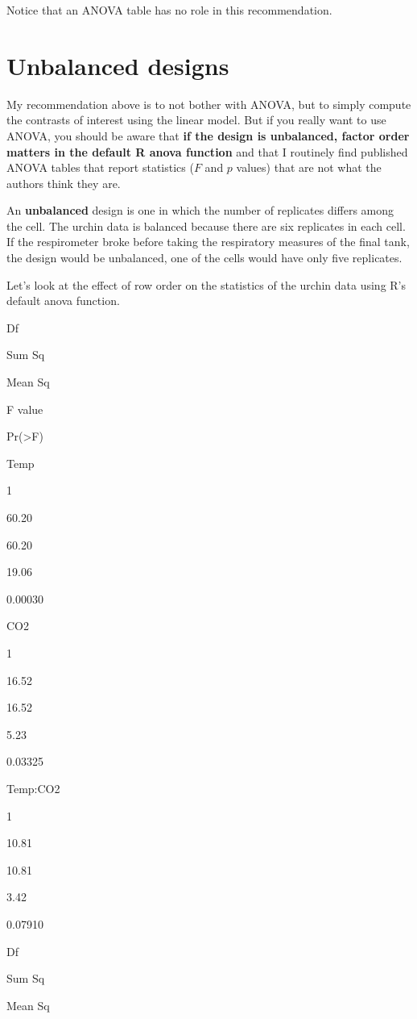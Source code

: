 \documentclass[]{book}
\begin{document}
Notice that an ANOVA table has no role in this recommendation.

\hypertarget{unbalanced-designs}{%
\section{Unbalanced designs}\label{unbalanced-designs}}

My recommendation above is to not bother with ANOVA, but to simply compute the contrasts of interest using the linear model. But if you really want to use ANOVA, you should be aware that \textbf{if the design is unbalanced, factor order matters in the default R anova function} and that I routinely find published ANOVA tables that report statistics (\(F\) and \(p\) values) that are not what the authors think they are.

An \textbf{unbalanced} design is one in which the number of replicates differs among the cell. The urchin data is balanced because there are six replicates in each cell. If the respirometer broke before taking the respiratory measures of the final tank, the design would be unbalanced, one of the cells would have only five replicates.

Let's look at the effect of row order on the statistics of the urchin data using R's default anova function.

Df

Sum Sq

Mean Sq

F value

Pr(\textgreater F)

Temp

1

60.20

60.20

19.06

0.00030

CO2

1

16.52

16.52

5.23

0.03325

Temp:CO2

1

10.81

10.81

3.42

0.07910

Df

Sum Sq

Mean Sq
\end{document}
